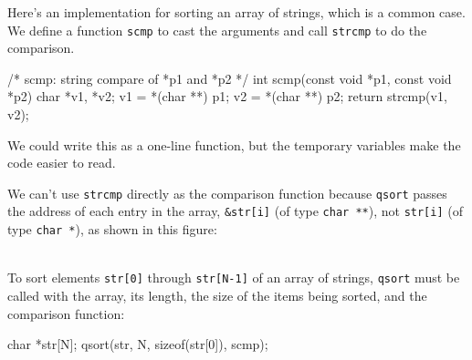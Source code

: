 Here's an implementation for sorting an array of strings, which is a common
case. We define a function \verb'scmp' to cast the arguments and call
\verb'strcmp' to do the comparison.
\begin{wellcode}
    /* scmp: string compare of *p1 and *p2 */
    int scmp(const void *p1, const void *p2)
    {
        char *v1, *v2;
        v1 = *(char **) p1;
        v2 = *(char **) p2;
        return strcmp(v1, v2);
    }
\end{wellcode}
We could write this as a one-line function, but the temporary variables
make the code easier to read.

We can't use \verb'strcmp' directly as the comparison function because
\verb'qsort' passes the address of each entry in the array, \verb'&str[i]'
(of type \verb'char **'), not \verb'str[i]' (of type \verb'char *'), as
shown in this figure:
\begin{figure}[h]
    \centering
\end{figure}\\
To sort elements \verb'str[0]' through \verb'str[N-1]' of an array of
strings, \verb'qsort' must be called with the array, its length, the size
of the items being sorted, and the comparison function:
\begin{wellcode}
    char *str[N];
    qsort(str, N, sizeof(str[0]), scmp);
\end{wellcode}

